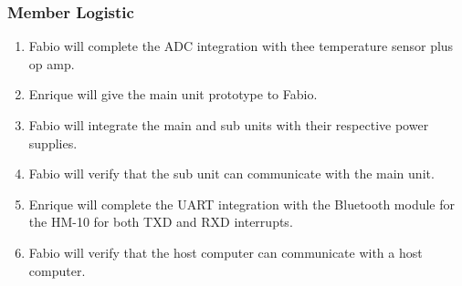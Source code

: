 \subsubsection{Member Logistic}
\begin{enumerate}
  \item Fabio will complete the ADC integration with thee temperature sensor plus op amp.
  \item Enrique will give the main unit prototype to Fabio.
  \item Fabio will integrate the main and sub units with their respective power supplies.
  \item Fabio will verify that the sub unit can communicate with the main unit.
  \item Enrique will complete the UART integration with the Bluetooth module for the HM-10 for both TXD and RXD interrupts.
  \item Fabio will verify that the host computer can communicate with a host computer.
\end{enumerate}

